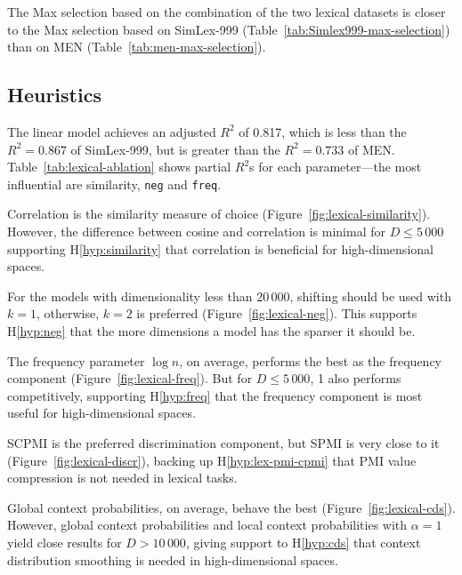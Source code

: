 The Max selection based on the combination of the two lexical datasets is closer to the Max selection based on SimLex-999 (Table~\ref{tab:Simlex999-max-selection}) than on MEN (Table~\ref{tab:men-max-selection}).



\subsection{Heuristics}

The linear model achieves an adjusted $R^2$ of 0.817, which is less than the $R^2 = 0.867$ of SimLex-999, but is greater than the $R^2 = 0.733$ of MEN. Table~\ref{tab:lexical-ablation} shows partial $R^2$s for each parameter---the most influential are similarity, \texttt{neg} and \texttt{freq}.


Correlation is the similarity measure of choice (Figure~\ref{fig:lexical-similarity}). However, the difference between cosine and correlation is minimal for $D \leq 5\,000$ supporting H\ref{hyp:similarity} that correlation is beneficial for high-dimensional spaces.



For the models with dimensionality less than 20\,000, shifting should be used with $k = 1$, otherwise, $k = 2$ is preferred (Figure~\ref{fig:lexical-neg}). This supports H\ref{hyp:neg} that the more dimensions a model has the sparser it should be.


The frequency parameter $\log n$, on average, performs the best as the frequency component (Figure~\ref{fig:lexical-freq}). But for $D \leq 5\,000$, 1 also performs competitively, supporting H\ref{hyp:freq} that the frequency component is most useful for high-dimensional spaces.

SCPMI is the preferred discrimination component, but SPMI is very close to it (Figure~\ref{fig:lexical-discr}), backing up H\ref{hyp:lex-pmi-cpmi} that PMI value compression is not needed in lexical tasks.


Global context probabilities, on average, behave the best (Figure~\ref{fig:lexical-cds}). However, global context probabilities and local context probabilities with $\alpha = 1$ yield close results for $D > 10\,000$, giving support to H\ref{hyp:cds} that context distribution smoothing is needed in high-dimensional spaces.

